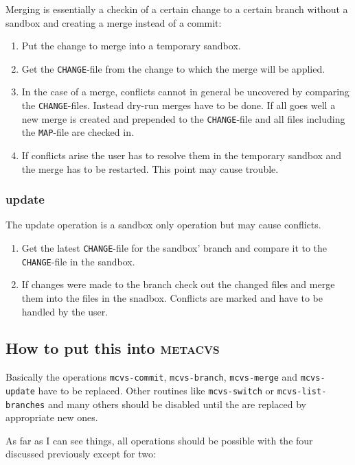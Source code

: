 \documentclass[fleqn, 10pt, a4paper]{article}
\begin{document}
Merging is essentially a checkin of a certain change to a certain
branch without a sandbox and creating a merge instead of a commit:

\begin{enumerate}
\item Put the change to merge into a temporary sandbox.
\item Get the \texttt{CHANGE}-file from the change to which
the merge will be applied.
\item In the case of a merge, conflicts cannot in general
be uncovered by comparing the \texttt{CHANGE}-files. Instead
dry-run merges have to be done. If all goes well a new merge
is created and prepended to the \texttt{CHANGE}-file and all files
including the \texttt{MAP}-file are checked in.
\item If conflicts arise the user has to resolve them in the
temporary sandbox and the merge has to be restarted. This point
may cause trouble.
\end{enumerate}

\subsubsection{update}

The update operation is a sandbox only operation but may cause
conflicts.

\begin{enumerate}
\item Get the latest \texttt{CHANGE}-file for the sandbox' branch
and compare it to the \texttt{CHANGE}-file in the sandbox.
\item If changes were made to the branch check out the
changed files and merge them into the files in
the snadbox. Conflicts are marked and have to be handled by
the user.
\end{enumerate}

\subsection{How to put this into \textsc{metacvs}}
Basically the operations \texttt{mcvs-commit},
\texttt{mcvs-branch}, \texttt{mcvs-merge} and \texttt{mcvs-update}
have to be replaced. Other routines like \texttt{mcvs-switch} or
\texttt{mcvs-list-branches} and many others should be disabled
until the are replaced by appropriate new ones.

As far as I can see things, all operations should be possible with
the four discussed previously except for two:
\end{document}
